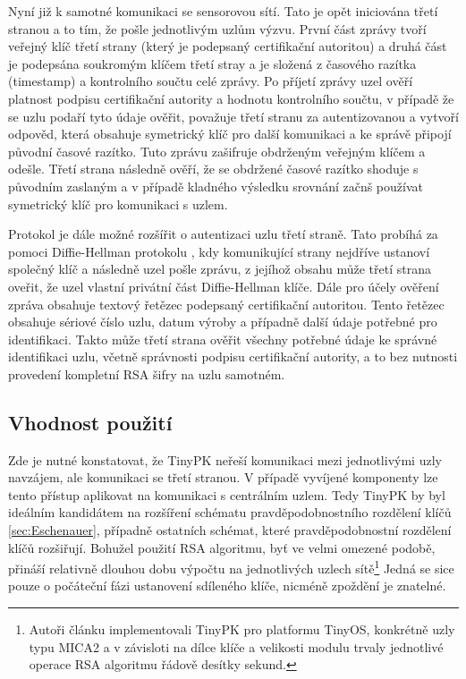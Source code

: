 \documentclass[11pt,final,twoside]{fithesis2}
\begin{document}
Nyní již k samotné komunikaci se sensorovou sítí. Tato je opět iniciována třetí stranou a to tím, že pošle jednotlivým uzlům 
výzvu. První část zprávy tvoří veřejný klíč třetí strany (který je podepsaný certifikační autoritou) a druhá část je podepsána 
soukromým klíčem třetí stray a je složená z časového razítka (timestamp) a kontrolního součtu celé zprávy. Po příjetí zprávy
uzel ověří platnost podpisu certifikační autority a hodnotu kontrolního součtu, v případě že se uzlu podaří tyto údaje ověřit, 
považuje třetí stranu za autentizovanou a vytvoří odpověd, která obsahuje symetrický klíč pro další komunikaci a ke správě připojí 
původní časové razítko. Tuto zprávu zašifruje obdrženým veřejným klíčem a odešle. Třetí strana následně ověří, že se obdržené 
časové razítko shoduje s původním zaslaným a v případě kladného výsledku srovnání začnš používat symetrický klíč pro 
komunikaci s uzlem.

Protokol je dále možné rozšířit o autentizaci uzlu třetí straně. Tato probíhá za pomoci Diffie-Hellman protokolu \cite{Diffie1976}, 
kdy komunikující strany nejdříve ustanoví společný klíč a následně uzel pošle zprávu, z jejíhož obsahu může třetí strana oveřit,
že uzel vlastní privátní část Diffie-Hellman klíče. Dále pro účely ověření zpráva obsahuje  textový řetězec podepsaný 
certifikační autoritou. Tento řetězec obsahuje sériové číslo uzlu, datum výroby a případně další údaje potřebné pro identifikaci. 
Takto může třetí strana ověřit všechny potřebné údaje ke správné identifikaci uzlu, včetně správnosti podpisu certifikační autority, 
a to bez nutnosti provedení kompletní RSA šifry na uzlu samotném.

\subsection{Vhodnost použití}

Zde je nutné konstatovat, že TinyPK neřeší komunikaci mezi jednotlivými uzly navzájem, ale komunikaci se třetí stranou. V případě vyvíjené 
komponenty lze tento přístup aplikovat na komunikaci s centrálním uzlem. Tedy TinyPK by byl ideálním kandidátem na rozšíření schématu pravděpodobnostního
rozdělení klíčů \ref{sec:Eschenauer}, případně ostatních schémat, které pravděpodobnostní rozdělení klíčů rozšiřují.
Bohužel použití RSA algoritmu, byť ve velmi omezené podobě, přináší relativně dlouhou dobu výpočtu na jednotlivých uzlech sítě\footnote{ 
Autoři článku implementovali TinyPK pro platformu TinyOS, konkrétně uzly typu MICA2 \cite{Inc.} a v závisloti na dílce klíče a velikosti modulu
trvaly jednotlivé operace RSA algoritmu řádově desítky sekund.} Jedná se sice pouze o počáteční fázi ustanovení sdíleného klíče, nicméně zpoždění je znatelné.
\end{document}
